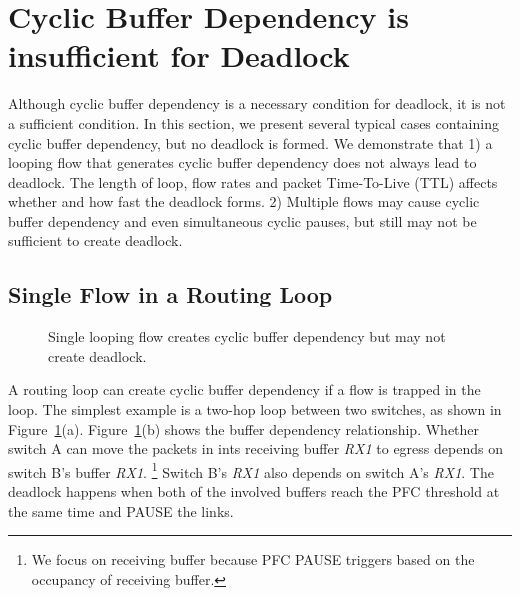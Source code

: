 \section{Cyclic Buffer Dependency is insufficient for Deadlock}
\label{sec:analysis}

Although cyclic buffer dependency is a necessary condition for deadlock, it is not a
sufficient condition. In this section, we present several typical cases containing cyclic 
buffer dependency, but no deadlock is formed. We demonstrate 
that 1) a looping flow that generates cyclic buffer dependency does not always lead to deadlock. 
The length of loop, flow rates and packet Time-To-Live (TTL) affects whether and how fast 
the deadlock forms. 2) Multiple flows may cause cyclic buffer dependency and even simultaneous cyclic pauses,
but still may not be sufficient to create deadlock. 

\subsection{Single Flow in a Routing Loop}

\begin{figure}[t]
\centering
{}
\caption{Single looping flow creates cyclic buffer dependency but may not create deadlock.}
\label{fig:loop}
\end{figure}


A routing loop can create cyclic buffer dependency if a flow is trapped in the loop.
The simplest example is a two-hop loop between two switches, as shown in Figure~\ref{fig:loop}(a).
Figure~\ref{fig:loop}(b) shows the buffer dependency relationship. Whether switch A can move
the packets in ints receiving buffer {\em RX1} to egress depends on switch B's buffer {\em RX1}.
\footnote{We focus on receiving buffer because PFC PAUSE triggers based on the occupancy of receiving buffer.}
Switch B's {\em RX1} also depends on switch A's {\em RX1}. The deadlock happens when
both of the involved buffers reach the PFC threshold at the same time and PAUSE the links.


